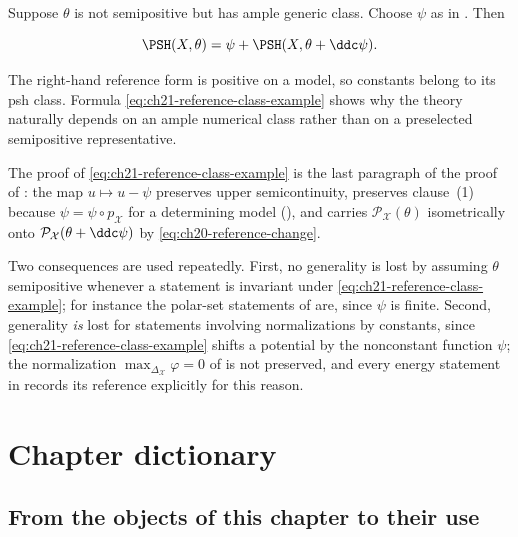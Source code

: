 \begin{example}
\label{ex:ch21-reference-class}
Suppose $\theta$ is not semipositive but has ample generic class.  Choose
$\psi$ as in .  Then

\begin{equation}
\label{eq:ch21-reference-class-example}
 \PSH(X,\theta)
   =\psi+\PSH(X,\theta+\ddc\psi).
\end{equation}

The right-hand reference form is positive on a model, so constants belong
to its psh class.  Formula \eqref{eq:ch21-reference-class-example} shows why
the theory naturally depends on an ample numerical class rather than on a
preselected semipositive representative.

The proof of \eqref{eq:ch21-reference-class-example} is the last paragraph
of the proof of : the map
$u\mapsto u-\psi$ preserves upper semicontinuity, preserves clause~(1)
because $\psi=\psi\circ p_{\mathcal X}$ for a determining model
(), and carries
$\mathcal P_{\mathcal X}(\theta)$ isometrically onto
$\mathcal P_{\mathcal X}(\theta+\ddc\psi)$ by
\eqref{eq:ch20-reference-change}.

Two consequences are used repeatedly.  First, no generality is lost by
assuming $\theta$ semipositive whenever a statement is invariant under
\eqref{eq:ch21-reference-class-example}; for instance the polar-set
statements of  are, since $\psi$ is
finite.  Second, generality \emph{is} lost for statements involving
normalizations by constants, since
\eqref{eq:ch21-reference-class-example} shifts a potential by the nonconstant
function $\psi$; the normalization
$\max_{\Delta_{\mathcal X}}\varphi=0$ of  is
not preserved, and every energy statement in
 records its reference explicitly for this reason.
\end{example}

\section{Chapter dictionary}
\label{sec:ch21-dictionary}

\subsection{From the objects of this chapter to their use}
\label{sec:ch21-dict-forward}

